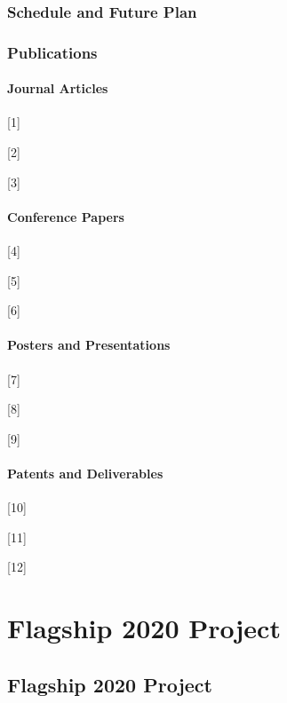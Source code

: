 \documentclass{book}
\begin{document}
\section{Schedule and Future Plan}

\section{Publications}

\subsection{Journal Articles}

[1] 

[2]

[3]

\subsection{Conference Papers}

[4]

[5]

[6]

\subsection{Posters and Presentations}

[7]

[8]

[9]

\subsection{Patents and Deliverables}

[10]

[11]

[12]


\part{Flagship 2020 Project}


\chapter{Flagship 2020 Project}
\end{document}
